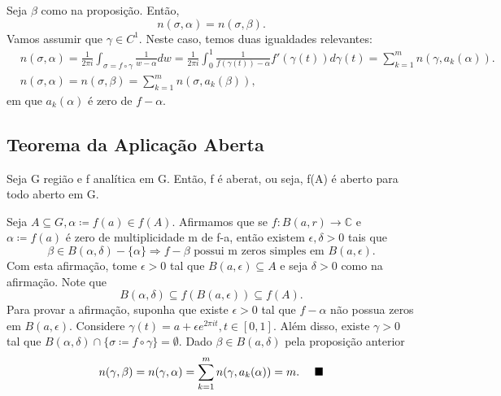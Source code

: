 \documentclass[ComplexAnalysis/complex.tex]{subfiles}
\begin{document}
\begin{proof*}
	Seja $\beta$ como na proposição. Então,
	$$
		n(\sigma, \alpha) = n(\sigma, \beta).
	$$
	Vamos assumir que $\gamma\in{C^{1}}$. Neste caso, temos duas igualdades relevantes:
	\begin{align*}
		 & n(\sigma, \alpha) = \frac{1}{2\pi i}\int_{\sigma=f\circ{\gamma}}^{}\frac{1}{w-\alpha}dw = \frac{1}{2\pi i}\int_{0}^{1}\frac{1}{f(\gamma(t))-\alpha}f'(\gamma(t))d\gamma(t) = \sum\limits_{k=1}^{m}n(\gamma, a_{k}(\alpha)). \\
		 & n(\sigma, \alpha) = n(\sigma, \beta) = \sum\limits_{k=1}^{m}n(\sigma, a_{k}(\beta)),
	\end{align*}
	em que $a_{k}(\alpha)$ é zero de $f-\alpha.$ \qedsymbol
\end{proof*}
\subsection{Teorema da Aplicação Aberta}
\begin{theorem*}
	Seja G região e f analítica em G. Então, f é aberat, ou seja, f(A) é aberto para todo aberto em G.
\end{theorem*}
\begin{proof*}
	Seja $A\subseteq{G}, \alpha\coloneqq f(a)\in{f(A)}.$ Afirmamos que se $f:B(a, r)\rightarrow \mathbb{C}$ e $\alpha\coloneqq f(a)$ é zero de
	multiplicidade m de f-a, então existem $\epsilon, \delta > 0$ tais que
	$$
		\beta\in{B(\alpha, \delta)- \{\alpha\} }\Rightarrow f-\beta\text{ possui m zeros simples em }B(a, \epsilon).
	$$
	Com esta afirmação, tome $\epsilon > 0$ tal que $B(a, \epsilon)\subseteq{A}$ e seja $\delta > 0$ como na afirmação.
	Note que
	$$
		B(\alpha, \delta)\subseteq{f(B(a, \epsilon))}\subseteq{f(A)}.
	$$
	Para provar a afirmação, suponha que existe $\epsilon > 0$ tal que $f - \alpha$ não possua zeros em $B(a, \epsilon)$. Considere
	$\gamma(t) = a + \epsilon e^{2\pi it}, t\in[0, 1].$ Além disso, existe $\gamma > 0$ tal que $B(\alpha, \delta)\cap \{\sigma\coloneqq f\circ{\gamma}\}=\emptyset$.
	Dado $\beta\in{B(a, \delta)}$ pela proposição anterior
	$$
		n(\gamma, \beta) = n(\gamma, \alpha) = \sum\limits_{k=1}^{m}n(\gamma, a_{k}(\alpha)) = m.\quad\text{ $\blacksquare$}
	$$
\end{proof*}
\end{document}

